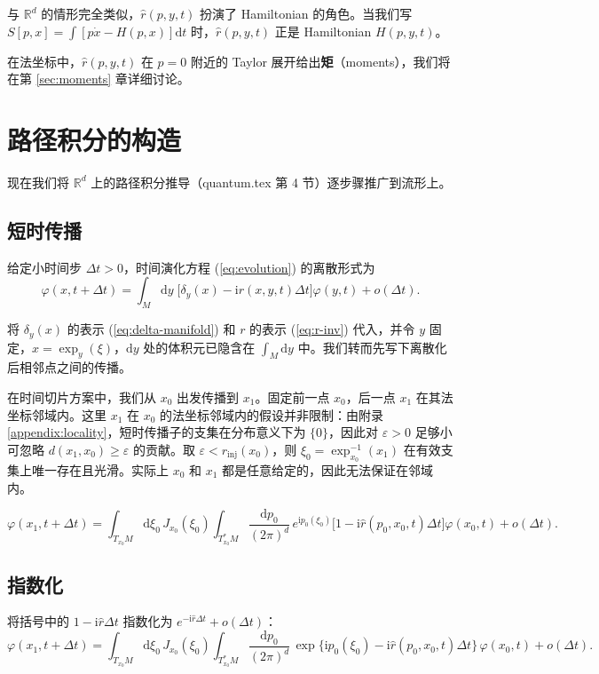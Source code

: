 \documentclass{book}
\newcommand{\mathd}{\mathrm{d}}
\newcommand{\mathi}{\mathrm{i}}
\newcommand{\mathpi}{\pi}
\newcommand{\todo}[1]{{\color{red}#1}}
\begin{document}
与 $\mathbb{R}^d$ 的情形完全类似，$\hat{r}(p,y,t)$ 扮演了 Hamiltonian 的角色。当我们写 $S[p,x] = \int [p\dot{x} - H(p,x)]\mathd t$ 时，$\hat{r}(p,y,t)$ 正是 Hamiltonian $H(p,y,t)$。

在法坐标中，$\hat{r}(p,y,t)$ 在 $p=0$ 附近的 Taylor 展开给出\textbf{矩}（moments），我们将在第 \ref{sec:moments} 章详细讨论。

\chapter{路径积分的构造}\label{sec:pathint}

现在我们将 $\mathbb{R}^d$ 上的路径积分推导（quantum.tex 第 4 节）逐步骤推广到流形上。

\section{短时传播}

给定小时间步 $\Delta t > 0$，时间演化方程 (\ref{eq:evolution}) 的离散形式为
\[
\varphi(x, t + \Delta t) = \int_M \mathd y \; \bigl[ \delta_y(x) - \mathi r(x,y,t) \Delta t \bigr] \varphi(y,t) + o(\Delta t).
\]

将 $\delta_y(x)$ 的表示 (\ref{eq:delta-manifold}) 和 $r$ 的表示 (\ref{eq:r-inv}) 代入，并令 $y$ 固定，$x = \exp_y(\xi)$，$\mathd y$ 处的体积元已隐含在 $\int_M \mathd y$ 中。我们转而先写下离散化后相邻点之间的传播。

在时间切片方案中，我们从 $x_0$ 出发传播到 $x_1$。固定前一点 $x_0$，后一点 $x_1$ 在其法坐标邻域内。这里 $x_1$ 在 $x_0$ 的法坐标邻域内的假设并非限制：由附录 \ref{appendix:locality}，短时传播子的支集在分布意义下为 $\{0\}$，因此对 $\varepsilon > 0$ 足够小可忽略 $d(x_1,x_0) \ge \varepsilon$ 的贡献。取 $\varepsilon < r_{\mathrm{inj}}(x_0)$，则 $\xi_0 = \exp_{x_0}^{-1}(x_1)$ 在有效支集上唯一存在且光滑。\todo{实际上 $x_0$ 和 $x_1$ 都是任意给定的，因此无法保证在邻域内。}

\[
\varphi(x_1, t+\Delta t) = \int_{T_{x_0}M} \mathd\xi_0 \, J_{x_0}(\xi_0) \int_{T_{x_0}^*M} \frac{\mathd p_0}{(2\mathpi)^d} \, e^{\mathi p_0(\xi_0)} \bigl[1 - \mathi \hat{r}(p_0, x_0, t) \Delta t \bigr] \varphi(x_0, t) + o(\Delta t).
\]

\section{指数化}

将括号中的 $1 - \mathi \hat{r} \Delta t$ 指数化为 $e^{-\mathi \hat{r} \Delta t} + o(\Delta t)$：
\[
\varphi(x_1, t+\Delta t) = \int_{T_{x_0}M} \mathd\xi_0 \, J_{x_0}(\xi_0) \int_{T_{x_0}^*M} \frac{\mathd p_0}{(2\mathpi)^d} \,
\exp\bigl\{ \mathi p_0(\xi_0) - \mathi \hat{r}(p_0, x_0, t) \Delta t \bigr\} \, \varphi(x_0, t) + o(\Delta t).
\]
\end{document}
